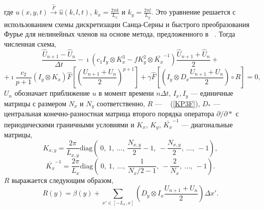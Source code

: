 где $u (x, y, t) \xrightarrow {\hat{F}} \hat{u} (k, l, t)$, $k_x = \frac{2 \pi k}{L_x}$ и $ k_y = \frac{2 \pi l}{L_y}$. Это уравнение решается с использованием схемы дискретизации Санца-Серны и быстрого преобразования Фурье для нелинейных членов на основе метода, предложенного в ~\cite {Chebab2016}. Тогда численная схема,
	\begin{equation}
		\label{fkpscheme}
		\frac{\hat{U}_{n+1} - \hat{U}_{n}}{\Delta t} - \imath \left(c_1 I_y \otimes K_x^3 - f K_y^2 \otimes \bar{K_x}^{-1} \right) \frac{\hat{U}_{n+1} + \hat{U}_{n}}{2} +
	\end{equation}
	$$
	+\imath \frac{c_2}{p+1}\left( I_y \otimes K_x \right) \hat{F} \left[ \left( \frac{U_{n+1} + U_{n}}{2}  \right)^{p+1}\right] + \gamma \hat{F} \left[ \left(I_y \otimes D_x \frac{U_{n+1} + U_{n}}{2} \right) \circ R \right] = 0,
	$$
$ U_n $ обозначает приближение $ u $ в момент времени $ n \Delta t $, $ I_x, I_y $ --- единичные матрицы с размером $ N_x $ и $ N_y $ соответственно, $ R $ ---  ~ (\ref{KP3F}), $ D_* $ --- центральная конечно-разностная матрица второго порядка оператора $ \partial / \partial *$ с периодическими граничными условиями и $ K_x $, $ K_y $, $ \bar {K_x}^{-1} $ --- диагональные матрицы,
$$
K_{x,y} = \frac{2 \pi}{L_{x,y}} \text{diag} \left( ~0, ~1, ~\dots, ~\frac{N_{x,y}}{2}-1, ~-\frac{N_{x,y}}{2}, ~\dots, ~-1 \right),
$$
$$
\bar{K_x}^{-1}= \frac{2 \pi}{L_x} \text{diag} \left( ~0, ~1, ~\dots, ~\frac{1}{N_{x}/2-1}, ~-\frac{2}{N_x}, ~\dots, ~-1 \right).
$$
$R$ выражается следующим образом,
\begin{equation}
	R(y) = \beta(y) + \sum_{x' \in \left[ -L_x, x\right]} \left(D_y \otimes I_x \frac{U_{n+1} + U_{n}}{2}\right) \Delta x'.
	\label{termRY}
\end{equation}

